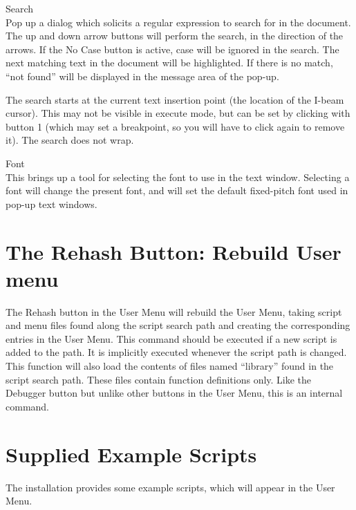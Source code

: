 \begin{description}
\item{\cb Search}\\
Pop up a dialog which solicits a regular expression to search for in
the document.  The up and down arrow buttons will perform the search,
in the direction of the arrows.  If the {\cb No Case} button is
active, case will be ignored in the search.  The next matching text in
the document will be highlighted.  If there is no match, ``not found''
will be displayed in the message area of the pop-up.

The search starts at the current text insertion point (the
location of the I-beam cursor).  This may not be visible in
execute mode, but can be set by clicking with button 1 (which may
set a breakpoint, so you will have to click again to remove it).
The search does not wrap.

\item{Font}\\
This brings up a tool for selecting the font to use in the text
window.  Selecting a font will change the present font, and will
set the default fixed-pitch font used in pop-up text windows.
\end{description}


\section{The {\cb Rehash} Button: Rebuild User menu}

The {\cb Rehash} button in the {\cb User Menu} will rebuild the {\cb
User Menu}, taking script and menu files found along the script search
path and creating the corresponding entries in the {\cb User Menu}. 
This command should be executed if a new script is added to the path. 
It is implicitly executed whenever the script path is changed.  This
function will also load the contents of files named ``{\vt library}''
found in the script search path.  These files contain function
definitions only.  Like the {\cb Debugger} button but unlike other
buttons in the {\cb User Menu}, this is an internal command.


\section{Supplied Example Scripts}
The {\Xic} installation provides some example scripts, which will
appear in the {\cb User Menu}.

